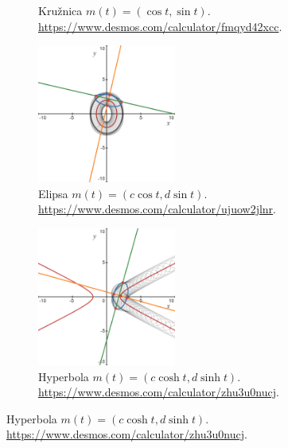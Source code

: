 \documentclass{article}
\begin{document}
\begin{figure}[h]
\begin{subfigure}[t]{0.49\textwidth}
		\caption{Kružnica $m(t)=(\cos t, \sin t).$ \\
		\url{https://www.desmos.com/calculator/fmqyd42xcc}.}
		\label{fig:kruznica}
	\end{subfigure}
    \hfill
    \begin{subfigure}[t]{0.49\textwidth}
        \centering
		\includegraphics[width=0.5\textwidth]{images/elipsa_desmos.png}
		\caption{Elipsa $m(t)=(c \cos t, d \sin t).$ \\
		\url{https://www.desmos.com/calculator/ujuow2jlnr}.}
		\label{fig:elipsa}
	\end{subfigure}
    \hfill
    \begin{subfigure}[t]{0.49\textwidth}
        \centering
		\includegraphics[width=0.5\textwidth]{images/hyperbola_desmos.png}
		\caption{Hyperbola $m(t)=(c \cosh t, d \sinh t).$ \\
		\url{https://www.desmos.com/calculator/zhu3u0nucj}.}
		\label{fig:hyperbola}
	\end{subfigure}

\end{figure}
\end{document}
